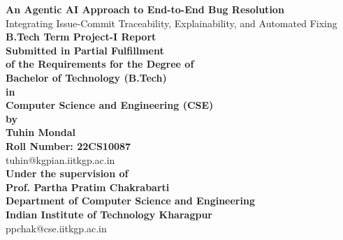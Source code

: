 \documentclass[11pt,english,a4paper]{article}
\begin{document}
	\thispagestyle{empty}
\begin{titlepage}
\begin{center}
    \textbf{\fontsize{17.28pt}{14pt}\selectfont An Agentic AI Approach to End-to-End Bug Resolution} \\
    \vspace{0.1in}
    \fontsize{14pt}{14pt}\selectfont Integrating Issue-Commit Traceability, Explainability, and Automated Fixing\\
    \vspace{0.6in}
    {\fontsize{15pt}{14pt} \textbf{B.Tech Term Project-I Report \\}}        
    \vspace{0.5in}
    {\large\bf Submitted in Partial Fulfillment\\ of the Requirements for the Degree of}\\
     \vspace{0.3in}
     {\large\bf Bachelor of Technology (B.Tech)}\\
     {\large\bf in}\\
     {\large\bf Computer Science and Engineering (CSE)}\\     
    \vspace{0.5in}
    {\large\bf by}\\
    \vspace{0.3in}
    {\Large\bf Tuhin Mondal}\\
    \vspace{0.1in}
    {\Large\bf Roll Number: 22CS10087}\\
    \vspace{0.05in}
    {tuhin@kgpian.iitkgp.ac.in\\}
    \vspace{0.5in}
    {\large\bf Under the supervision of}\\
    \vspace{0.2in}
     {\Large\bf  Prof. Partha Pratim Chakrabarti}\\
    \vspace{0.1in}
    {\large\bf Department of Computer Science and Engineering}\\
    {\large\bf Indian Institute of Technology Kharagpur}\\  
    \vspace{0.05in}
    {ppchak@cse.iitkgp.ac.in}\\
    

\end{center}
\end{titlepage}
\end{document}
